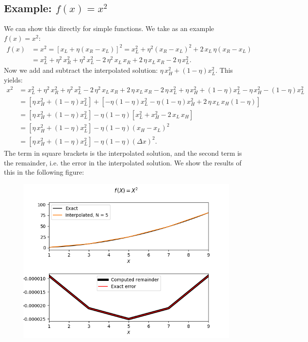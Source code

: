 \documentclass[10pt,preprint]{aastex}
\begin{document}
\subsection{Example: $f\left(x\right)=x^{2}$}
We can show this directly for simple functions. We take as an example $f\left(x\right)=x^{2}$:
\begin{align}
    f\left(x\right)&=x^{2}=\left[x_{L}+\eta\left(x_{R}-x_{L}\right)\right]^{2}=x_{L}^{2}+\eta^{2}\left(x_{R}-x_{L}\right)^{2}+2\,x_{L}\,\eta\left(x_{R}-x_{L}\right)\\
    &=x_{L}^{2}+\eta^{2}\,x_{R}^{2}+\eta^{2}\,x_{L}^{2}-2\,\eta^{2}\,x_{L}\,x_{R}+2\,\eta\,x_{L}\,x_{R}-2\,\eta\,x_{L}^{2}.
\end{align}
Now we add and subtract the interpolated solution: $\eta\,x_{H}^{2}+\left(1-\eta\right)x_{L}^{2}$. This yields:
\begin{align}
    x^{2}&=x_{L}^{2}+\eta^{2}\,x_{R}^{2}+\eta^{2}\,x_{L}^{2}-2\,\eta^{2}\,x_{L}\,x_{R}+2\,\eta\,x_{L}\,x_{R}-2\,\eta\,x_{L}^{2}+\eta\,x_{H}^{2}+\left(1-\eta\right)x_{L}^{2}-\eta\,x_{H}^{2}-\left(1-\eta\right)x_{L}^{2}\\
    &=\left[\eta\,x_{H}^{2}+\left(1-\eta\right)x_{L}^{2}\right]+\left[-\eta\left(1-\eta\right)x_{L}^{2}-\eta\left(1-\eta\right)x_{H}^{2}+2\,\eta\,x_{L}\,x_{H}\left(1-\eta\right)\right]\\
    &=\left[\eta\,x_{H}^{2}+\left(1-\eta\right)x_{L}^{2}\right]-\eta\left(1-\eta\right)\left[x_{L}^{2}+x_{H}^{2}-2\,x_{L}\,x_{H}\right]\\
    &=\left[\eta\,x_{H}^{2}+\left(1-\eta\right)x_{L}^{2}\right]-\eta\left(1-\eta\right)\left(x_{H}-x_{L}\right)^{2}\\
    &=\left[\eta\,x_{H}^{2}+\left(1-\eta\right)x_{L}^{2}\right]-\eta\left(1-\eta\right)\left(\Delta x\right)^{2}.
\end{align}
The term in square brackets is the interpolated solution, and the second term is the remainder, i.e. the error in the interpolated solution. We show the results of this in the following figure:
\begin{figure}[H]
\centering
\includegraphics[scale=0.75]{LinearInterpolationError}
\end{figure}
\end{document}
